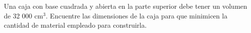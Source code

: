 \item Una caja con base cuadrada y abierta en la parte superior debe tener un volumen de 32 000 cm$^3$. Encuentre las dimensiones de la caja para que minimicen la cantidad de material empleado para construirla.
